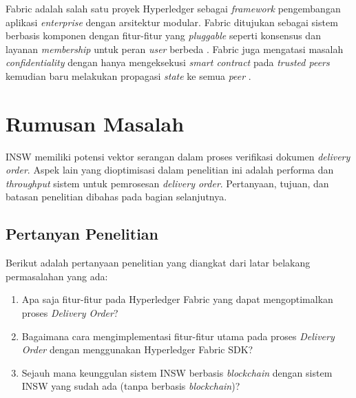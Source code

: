 Fabric adalah salah satu proyek Hyperledger sebagai \textit{framework} pengembangan aplikasi \textit{enterprise} dengan arsitektur modular. Fabric ditujukan sebagai sistem berbasis komponen dengan fitur-fitur yang \textit{pluggable} seperti konsensus dan layanan \textit{membership} untuk peran \textit{user} berbeda \cite{Dhillon2017}. Fabric juga mengatasi masalah \textit{confidentiality} dengan hanya mengeksekusi \textit{smart contract} pada \textit{trusted peers} kemudian baru melakukan propagasi \textit{state} ke semua \textit{peer} \cite{Androulaki2018}. 

\section{Rumusan Masalah}
\label{sec:masalah}

INSW memiliki potensi vektor serangan dalam proses verifikasi dokumen \textit{delivery order}. Aspek lain yang dioptimisasi dalam penelitian ini adalah performa dan \textit{throughput} sistem untuk pemrosesan \textit{delivery order}. Pertanyaan, tujuan, dan batasan penelitian dibahas pada bagian selanjutnya.


\subsection{Pertanyan Penelitian}
\label{sec:pertanyaanPenelitian}
Berikut adalah pertanyaan penelitian yang diangkat dari latar belakang permasalahan yang ada:
\begin{enumerate}

	\item Apa saja fitur-fitur pada Hyperledger Fabric yang dapat mengoptimalkan proses \textit{Delivery Order}?
	\item Bagaimana cara mengimplementasi fitur-fitur utama pada proses \textit{Delivery Order} dengan menggunakan Hyperledger Fabric SDK?
	\item Sejauh mana keunggulan sistem INSW berbasis \textit{blockchain} dengan sistem INSW yang sudah ada (tanpa berbasis \textit{blockchain})?
\end{enumerate}

